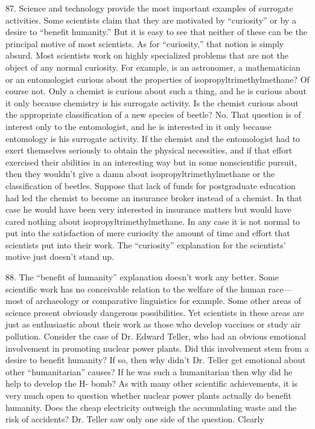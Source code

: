 \documentclass{article}
\begin{document}
\hspace{0.5cm} 87.  Science and technology provide the most important examples of surrogate activities.  Some 
scientists claim that they are motivated by “curiosity” or by a desire to “benefit humanity.” But it 
is easy to see that neither of these can be the principal motive of most scientists.  As for “curiosity,” 
that notion is simply absurd.  Most scientists work on highly specialized problems that are not the 
object of any normal curiosity.  For example, is an astronomer, a mathematician or an entomologist 
curious  about  the  properties  of  isopropyltrimethylmethane?  Of  course  not.   Only  a  chemist  is  
curious  about  such  a  thing,  and  he  is  curious  about  it  only  because  chemistry  is  his  surrogate  
activity.   Is  the  chemist  curious  about  the  appropriate  classification  of  a  new  species  of  beetle?  
No.  That question is of interest only to the entomologist, and he is interested in it only because 
entomology is his surrogate activity.  If the chemist and the entomologist had to exert themselves 
seriously  to  obtain  the  physical  necessities,  and  if  that  effort  exercised  their  abilities  in  an  
interesting  way  but  in  some  nonscientific  pursuit,  then  they  wouldn’t  give  a  damn  about  
isopropyltrimethylmethane  or  the  classification  of  beetles.   Suppose  that  lack  of  funds  for  
postgraduate education had led the chemist to become an insurance broker instead of a chemist.  In 
that case he would have been very interested in insurance matters but would have cared nothing 
about isopropyltrimethylmethane.  In any case it is not normal to put into the satisfaction of mere 
curiosity  the  amount  of  time  and  effort  that  scientists  put  into  their  work.   The  “curiosity”  
explanation for the scientists’ motive just doesn’t stand up. \vspace{\baselineskip}

88.  The “benefit of humanity” explanation doesn’t work any better.  Some scientific work has no 
conceivable  relation  to  the  welfare  of  the  human  race—most  of  archaeology  or  comparative  
linguistics for example.  Some other areas of science present obviously dangerous 
possibilities.  Yet scientists in these areas are just as enthusiastic about their work as those who 
develop  vaccines  or  study  air  pollution.   Consider  the  case  of  Dr. Edward  Teller,  who  had  an  
obvious  emotional  involvement  in  promoting  nuclear  power  plants.   Did  this  involvement  stem  
from  a  desire  to  benefit  humanity?  If  so,  then  why  didn’t  Dr. Teller  get  emotional  about  other  
“humanitarian”  causes?  If  he  was  such  a  humanitarian  then  why  did  he  help  to  develop  the  H-
bomb?  As  with  many  other  scientific  achievements,  it  is  very  much  open  to  question  whether  
nuclear  power  plants  actually  do  benefit  humanity.   Does  the  cheap  electricity  outweigh  the  
accumulating waste and the risk of accidents? Dr.  Teller saw only one side of the question. Clearly 
 
\end{document}
